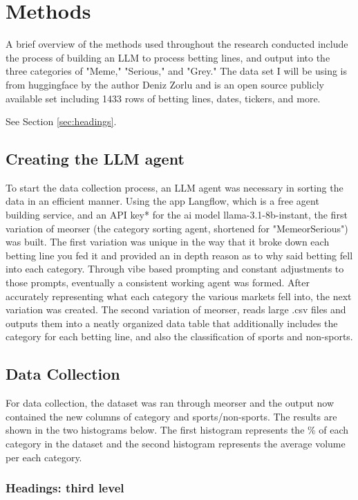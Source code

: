 \documentclass{article}
\begin{document}
\section{Methods}
A brief overview of the methods used throughout the research conducted include the process of building an LLM to process betting lines, and output into the three categories of "Meme," "Serious," and "Grey." The data set I will be using is from huggingface by the author Deniz Zorlu and is an open source publicly available set including 1433 rows of betting lines, dates, tickers, and more.
\label{sec:headings}

\lipsum[4] See Section \ref{sec:headings}.

\subsection{Creating the LLM agent}
To start the data collection process, an LLM agent was necessary in sorting the data in an efficient manner. Using the app Langflow, which is a free agent building service, and an API key* for the ai model llama-3.1-8b-instant, the first variation of meorser (the category sorting agent, shortened for "MemeorSerious") was built. The first variation was unique in the way that it broke down each betting line you fed it and provided an in depth reason as to why said betting fell into each category. Through vibe based prompting and constant adjustments to those prompts, eventually a consistent working agent was formed. After accurately representing what each category the various markets fell into, the next variation was created. The second variation of meorser, reads large .csv files and outputs them into a neatly organized data table that additionally includes the category for each betting line, and also the classification of sports and non-sports.  
\subsection{Data Collection}
For data collection, the dataset was ran through meorser and the output now contained the new columns of category and sports/non-sports. The results are shown in the two histograms below. The first histogram represents the \% of each category in the dataset and the second histogram represents the average volume per each category. 


\subsubsection{Headings: third level}
\lipsum[6]
\end{document}
